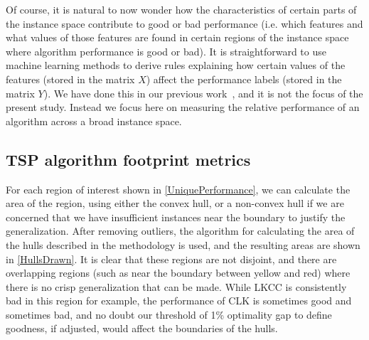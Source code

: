 \documentclass[conference]{IEEEtran}
\begin{document}
Of course, it is natural to now wonder how the characteristics of certain parts of the instance space contribute to good or bad performance (i.e. which features and what values of those features are found in certain regions of the instance space where algorithm performance is good or bad). It is straightforward to use machine learning methods to derive rules explaining how certain values of the features (stored in the matrix $X$) affect the performance labels (stored in the matrix $Y$). We have done this in our previous work~\cite{AMAI}, and it is not the focus of the present study. Instead we focus here on measuring the relative performance of an algorithm across a broad instance space.

\subsection{TSP algorithm footprint metrics}
For each region of interest shown in \autoref{UniquePerformance}, we can calculate the area of the region, using either the convex hull, or a non-convex hull if we are concerned that we have insufficient instances near the boundary to justify the generalization. After removing outliers, the algorithm for calculating the area of the hulls described in the methodology is used, and the resulting areas are shown in \autoref{HullsDrawn}.
It is clear that these regions are not disjoint, and there are overlapping regions (such as near the boundary between yellow and red) where there is no crisp generalization that can be made. While LKCC is consistently bad in this region for example, the performance of CLK is sometimes good and sometimes bad, and no doubt our threshold of 1\% optimality gap to define goodness, if adjusted, would affect the boundaries of the hulls.
\end{document}
